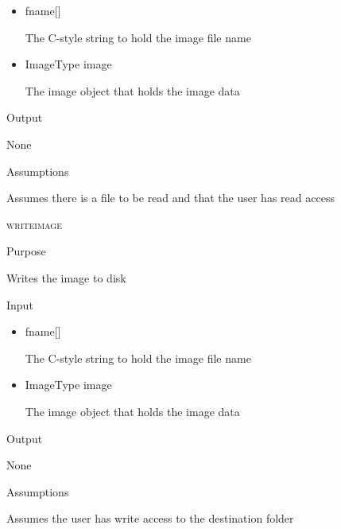\documentclass[pdftex, 11pt]{article}
\begin{document}
\begin{description}
\begin{description}
\begin{itemize}
					\item{fname[]}

						The C-style string to hold the image 
						file name

					\item{ImageType image}

						The image object that holds the
						image data

				\end{itemize}

			\item{Output}

				None

			\item{Assumptions}

				Assumes there is a file to be read and that the
				user has read access

		\end{description}


	\item{\textsc{writeimage}}
		\begin{description}
			\item{Purpose}

				Writes the image to disk

			\item{Input}

				\begin{itemize}

					\item{fname[]}

						The C-style string to hold the image 
						file name

					\item{ImageType image}

						The image object that holds the
						image data

				\end{itemize}



			\item{Output}

				None

			\item{Assumptions}

				Assumes the user has write access to the
				destination folder

		\end{description}


\end{description}
\end{document}
